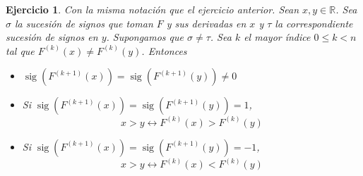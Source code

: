 \documentclass[10pt]{article}
\newtheorem{ejer}{Ejercicio}
\theoremstyle{definition}
\newcommand{\RR}{\mathbb{R}}
\newcommand{\sig}{\operatorname{sig}}
\begin{document}
\begin{ejer} Con la misma notación que el ejercicio anterior. Sean $x,y\in\RR$. Sea $\sigma$ la sucesión de signos que toman $F$ y sus derivadas en $x$ y $\tau$ la correspondiente sucesión de signos en $y$. Supongamos que $\sigma\neq\tau$. Sea $k$ el mayor índice $0\leq k<n$ tal que $F^{(k)}(x)\neq F^{(k)}(y)$. Entonces
\begin{itemize}
    \item $\sig(F^{(k+1)}(x))=\sig(F^{(k+1)}(y))\neq 0$
    \item Si $\sig(F^{(k+1)}(x))=\sig(F^{(k+1)}(y))=1$,
    \[x>y\leftrightarrow F^{(k)}(x)>F^{(k)}(y)\]
    \item Si $\sig(F^{(k+1)}(x))=\sig(F^{(k+1)}(y))=-1$,
    \[x>y\leftrightarrow F^{(k)}(x)<F^{(k)}(y)\]
\end{itemize}
\end{ejer}
\end{document}
